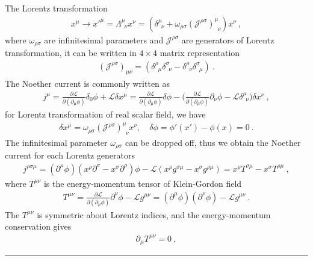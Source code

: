 \documentclass[12pt]{report}
\numberwithin{problemname}{chapter}
\newenvironment{solution}{\vspace{1em}\par\noindent{\large\textbf{\textsc{Solution}}}\par}{\vspace{1em}\hrule}
\begin{document}
\begin{solution}
The Lorentz transformation
\begin{align}
    x^{\mu}\rightarrow x'^{\mu}=\Lambda^{\mu}_{\enspace\nu}x^{\nu}=(\delta^{\mu}_{\enspace\nu}+\omega_{\rho\sigma}(\mathcal{J}^{\rho\sigma})^{\mu}_{\enspace\nu})x^{\nu}\ ,
\end{align}
where $\omega_{\rho\sigma}$ are infinitesimal parameters and $\mathcal{J}^{\rho\sigma}$ are generators of Lorentz transformation, it can be written in $4\times 4$ matrix representation
\begin{align}
    (\mathcal{J}^{\rho\sigma})_{\mu\nu}=(\delta^{\rho}_{\enspace\mu}\delta^{\sigma}_{\enspace\nu}-\delta^{\rho}_{\enspace\nu}\delta^{\sigma}_{\enspace\mu})\ .
\end{align}
The Noether current is commonly written as
\begin{align}
    j^{\mu}=\frac{\partial\mathcal{L}}{\partial(\partial_{\mu}\phi)}\delta_{0}\phi+\mathcal{L}\delta x^{\mu}=\frac{\partial\mathcal{L}}{\partial(\partial_{\mu}\phi)}\delta\phi-\Big(\frac{\partial\mathcal{L}}{\partial(\partial_{\mu}\phi)}\partial_{\nu}\phi-\mathcal{L}\delta^{\mu}_{\enspace\nu}\Big)\delta x^{\nu}\ ,
\end{align}
for Lorentz transformation of real scalar field, we have
\begin{align}
    \delta x^{\mu}=\omega_{\rho\sigma}(\mathcal{J}^{\rho\sigma})^{\mu}_{\enspace\nu}x^{\nu},\quad\delta\phi=\phi'(x')-\phi(x)=0\ .
\end{align}
The infinitesimal parameter $\omega_{\rho\sigma}$ can be dropped off, thus we obtain the Noether current for each Lorentz generators
\begin{align}
    j^{\rho\sigma\mu}=(\partial^{\mu}\phi)(x^{\rho}\partial^{\sigma}-x^{\sigma}\partial^{\rho})\phi-\mathcal{L}(x^{\rho}g^{\sigma\mu}-x^{\sigma}g^{\rho\mu})=x^{\rho}T^{\sigma\mu}-x^{\sigma}T^{\rho\mu}\ ,
\end{align}
where $T^{\mu\nu}$ is the energy-momentum tensor of Klein-Gordon field
\begin{align}
    T^{\mu\nu}=\frac{\partial\mathcal{L}}{\partial(\partial_{\mu}\phi)}\partial^{\nu}\phi-\mathcal{L}g^{\mu\nu}=(\partial^{\mu}\phi)(\partial^{\nu}\phi)-\mathcal{L}g^{\mu\nu}\ .
\end{align}
The $T^{\mu\nu}$ is symmetric about Lorentz indices, and the energy-momentum conservation gives
\begin{align}
    \partial_{\mu}T^{\mu\nu}=0\ ,
\end{align}

\end{solution}
\end{document}
